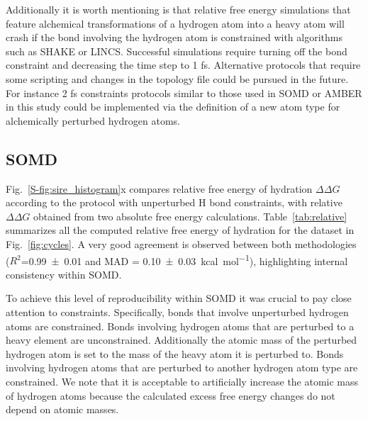 \documentclass[journal=jctcce,manuscript=article]{achemso}
\newcommand{\inpopt}[1]{\texttt{#1}}
\begin{document}
Additionally it is worth mentioning is that relative free energy 
simulations that feature alchemical transformations of a hydrogen atom into a heavy atom will crash if the bond involving the hydrogen atom is constrained with algorithms such as SHAKE or LINCS.
Successful simulations require turning off the bond constraint and decreasing the time step to 1 fs. Alternative protocols that require some scripting and changes in the topology file could be pursued in the future. For instance 2 fs constraints protocols similar to those used in SOMD or AMBER in this study could be implemented via the definition of a new atom type for alchemically perturbed hydrogen atoms. 

\subsection{SOMD}
\label{sec:somd-results}

Fig.~\ref{S-fig:sire_histogram}x compares relative free energy of hydration 
$\Delta\Delta G$ according to the protocol with unperturbed H bond constraints, with relative 
$\Delta \Delta G$ obtained from two absolute free energy calculations. 
Table~\ref{tab:relative} summarizes all the computed relative free energy of 
hydration for the dataset in Fig.~\ref{fig:cycles}.
A very good agreement is observed between both methodologies 
($R^2$=\SI{0.99+-0.01}{} and MAD = \SI{0.10+-0.03}{kcal.mol^{-1}}), 
highlighting internal consistency within SOMD.

To achieve this level of reproducibility within SOMD it was crucial to pay close attention to constraints. Specifically, bonds that involve unperturbed hydrogen atoms are constrained. Bonds involving hydrogen atoms that are perturbed to a heavy element are unconstrained.  Additionally the atomic mass of the perturbed hydrogen atom is set to the mass of the heavy atom it is 
perturbed to.  Bonds involving hydrogen atoms that are perturbed to another hydrogen atom type are constrained. We note that it is acceptable to artificially increase the atomic mass of hydrogen atoms because the calculated excess free energy changes do not depend on atomic masses. 
\end{document}
